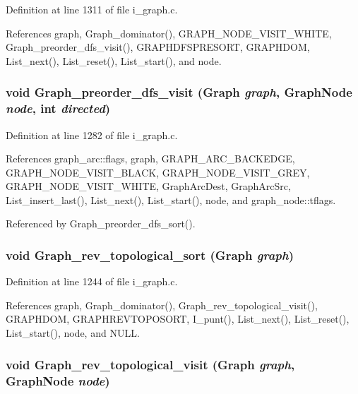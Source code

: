 Definition at line 1311 of file i\_\-graph.c.

References graph, Graph\_\-dominator(), GRAPH\_\-NODE\_\-VISIT\_\-WHITE, Graph\_\-preorder\_\-dfs\_\-visit(), GRAPHDFSPRESORT, GRAPHDOM, List\_\-next(), List\_\-reset(), List\_\-start(), and node.
\subsubsection{\setlength{\rightskip}{0pt plus 5cm}void Graph\_\-preorder\_\-dfs\_\-visit (\bf{Graph} {\em graph}, \bf{Graph\-Node} {\em node}, int {\em directed})}\label{i__graph_8c_04a038c514fda24c5876af6db7d5fd22}




Definition at line 1282 of file i\_\-graph.c.

References graph\_\-arc::flags, graph, GRAPH\_\-ARC\_\-BACKEDGE, GRAPH\_\-NODE\_\-VISIT\_\-BLACK, GRAPH\_\-NODE\_\-VISIT\_\-GREY, GRAPH\_\-NODE\_\-VISIT\_\-WHITE, Graph\-Arc\-Dest, Graph\-Arc\-Src, List\_\-insert\_\-last(), List\_\-next(), List\_\-start(), node, and graph\_\-node::tflags.

Referenced by Graph\_\-preorder\_\-dfs\_\-sort().
\subsubsection{\setlength{\rightskip}{0pt plus 5cm}void Graph\_\-rev\_\-topological\_\-sort (\bf{Graph} {\em graph})}\label{i__graph_8c_d952ed4c6047fd4d0cade5772979e3b9}




Definition at line 1244 of file i\_\-graph.c.

References graph, Graph\_\-dominator(), Graph\_\-rev\_\-topological\_\-visit(), GRAPHDOM, GRAPHREVTOPOSORT, I\_\-punt(), List\_\-next(), List\_\-reset(), List\_\-start(), node, and NULL.
\subsubsection{\setlength{\rightskip}{0pt plus 5cm}void Graph\_\-rev\_\-topological\_\-visit (\bf{Graph} {\em graph}, \bf{Graph\-Node} {\em node})}\label{i__graph_8c_8bccf58dce861720865ea0278130d734}




